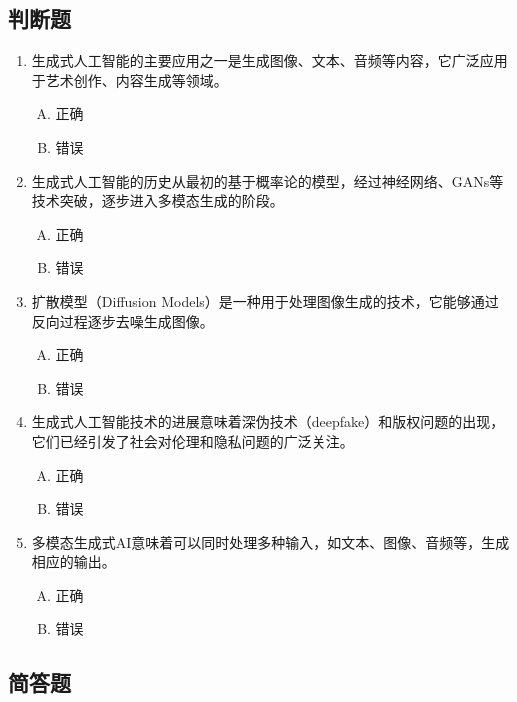 \subsection*{判断题}

\begin{enumerate}
    \item 生成式人工智能的主要应用之一是生成图像、文本、音频等内容，它广泛应用于艺术创作、内容生成等领域。  
    \begin{enumerate}[A.]
        \item 正确  
        \item 错误
    \end{enumerate}
    
    \item 生成式人工智能的历史从最初的基于概率论的模型，经过神经网络、GANs等技术突破，逐步进入多模态生成的阶段。  
    \begin{enumerate}[A.]
        \item 正确  
        \item 错误
    \end{enumerate}
    
    \item 扩散模型（Diffusion Models）是一种用于处理图像生成的技术，它能够通过反向过程逐步去噪生成图像。  
    \begin{enumerate}[A.]
        \item 正确  
        \item 错误
    \end{enumerate}
    
    \item 生成式人工智能技术的进展意味着深伪技术（deepfake）和版权问题的出现，它们已经引发了社会对伦理和隐私问题的广泛关注。  
    \begin{enumerate}[A.]
        \item 正确  
        \item 错误
    \end{enumerate}
    
    \item 多模态生成式AI意味着可以同时处理多种输入，如文本、图像、音频等，生成相应的输出。  
    \begin{enumerate}[A.]
        \item 正确  
        \item 错误
    \end{enumerate}
\end{enumerate}

\subsection*{简答题}

